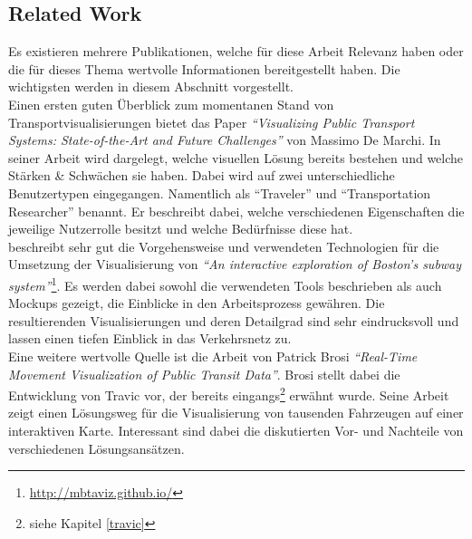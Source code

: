 \subsection{Related Work}
\label{sub:related_work}
  Es existieren mehrere Publikationen, welche für diese Arbeit Relevanz haben oder die für dieses Thema wertvolle Informationen bereitgestellt haben. Die wichtigsten werden in diesem Abschnitt vorgestellt.\\

  Einen ersten guten Überblick zum momentanen Stand von Transportvisualisierungen bietet das Paper \textit{"`Visualizing Public Transport Systems: State-of-the-Art and Future Challenges"'}\parencite{marchi} von Massimo De Marchi. In seiner Arbeit wird dargelegt, welche visuellen Lösung bereits bestehen und welche Stärken \& Schwächen sie haben. Dabei wird auf zwei unterschiedliche Benutzertypen eingegangen. Namentlich als "`Traveler"' und "`Transportation Researcher"' benannt. Er beschreibt dabei, welche verschiedenen Eigenschaften die jeweilige Nutzerrolle besitzt und welche Bedürfnisse diese hat.\\ 


  \parencite{mbtaviz} beschreibt sehr gut die Vorgehensweise und verwendeten Technologien für die Umsetzung der Visualisierung von \textit{"`An interactive exploration of Boston's subway system"'}\footnote{\url{http://mbtaviz.github.io/}}. Es werden dabei sowohl die verwendeten Tools beschrieben als auch Mockups gezeigt, die Einblicke in den Arbeitsprozess gewähren. Die resultierenden Visualisierungen und deren Detailgrad sind sehr eindrucksvoll und lassen einen tiefen Einblick in das Verkehrsnetz zu.\\

  Eine weitere wertvolle Quelle ist die Arbeit von Patrick Brosi \textit{"`Real-Time Movement Visualization of Public Transit Data"'}\parencite{brosi}. Brosi stellt dabei die Entwicklung von Travic vor, der bereits eingangs\footnote{siehe Kapitel \ref{travic}} erwähnt wurde. Seine Arbeit zeigt einen Lösungsweg für die Visualisierung von tausenden Fahrzeugen auf einer interaktiven Karte. Interessant sind dabei die diskutierten Vor- und Nachteile von verschiedenen Lösungsansätzen.

